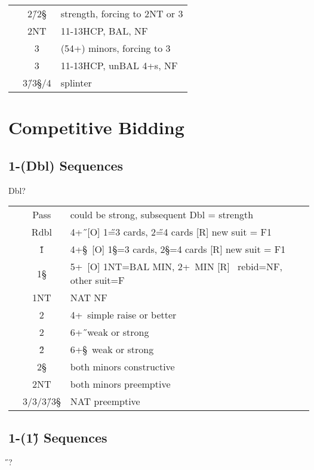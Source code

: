 \begin{longtable}{C{\linklength} C{\bidlength} l}
& 2\H/2\S & strength, forcing to 2NT or 3\D \\
& 2NT & 11-13HCP, BAL, NF\\
& 3\C & (54+) minors, forcing to 3\D \\
& 3\D & 11-13HCP, unBAL 4+\D s, NF \\
& 3\H/3\S/4\C & splinter\\
\end{longtable}


\hypertarget{1dcomp}{}
\section{Competitive Bidding}

\subsection{1\D-(Dbl) Sequences}

\begin{bidding}
\>\D\>Dbl\>?
\end{bidding}

\begin{longtable}{C{\linklength} C{\bidlength} l}
& Pass & could be strong, subsequent Dbl = strength \\
& Rdbl & 4+\H\ [O] 1\H=3 cards, 2\H=4 cards [R] new suit = F1 \\
& 1\H & 4+\S \ [O] 1\S=3 cards, 2\S=4 cards [R] new suit = F1 \\
& 1\S & 5+\C\ [O] 1NT=BAL MIN, 2+\C\ MIN [R] \C\ rebid=NF, other suit=F \\
& 1NT & NAT NF \\
& 2\C & 4+\D\ simple raise or better \\
& 2\D & 6+\H\ weak or strong \\
& 2\H & 6+\S\ weak or strong \\
& 2\S & both minors constructive \\
& 2NT & both minors preemptive \\
& 3\C/3\D/3\H/3\S & NAT preemptive \\ 
\end{longtable}

\subsection{1\D-(1\H) Sequences}

\begin{bidding}
\>\D{}\H\>?
\end{bidding}

